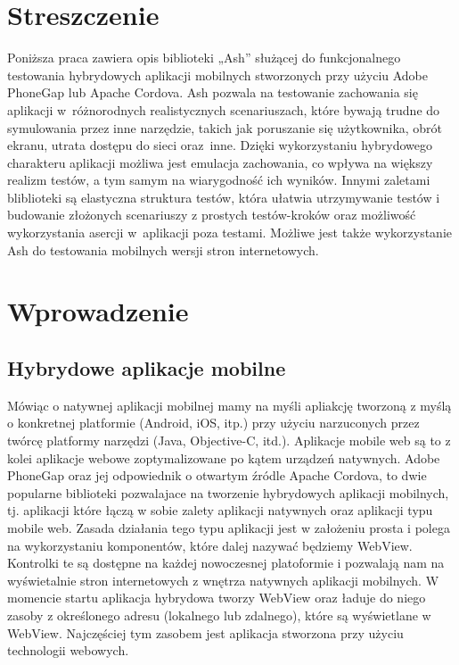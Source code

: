 \documentclass[a4paper]{article}
\begin{document}
\section{Streszczenie}
Poniższa praca zawiera opis biblioteki „Ash” służącej do funkcjonalnego testowania
hybrydowych aplikacji mobilnych stworzonych przy użyciu Adobe PhoneGap lub
Apache Cordova. Ash pozwala na testowanie zachowania się aplikacji w~różnorodnych
realistycznych scenariuszach, które bywają trudne do symulowania przez inne narzędzie, takich jak poruszanie się użytkownika,
obrót ekranu, utrata dostępu do sieci oraz~inne. Dzięki wykorzystaniu hybrydowego charakteru aplikacji
możliwa jest emulacja zachowania, co wpływa na większy realizm testów, a tym samym na wiarygodność ich wyników. Innymi
zaletami bliblioteki są elastyczna struktura testów, która ułatwia utrzymywanie
testów i budowanie złożonych scenariuszy z prostych testów-kroków oraz
możliwość wykorzystania asercji w~aplikacji poza testami.
Możliwe jest także wykorzystanie Ash do testowania mobilnych wersji stron internetowych. 

\section{Wprowadzenie}
\subsection{Hybrydowe aplikacje mobilne}
Mówiąc o natywnej aplikacji mobilnej mamy na myśli apliakcję tworzoną z myślą o konkretnej platformie (Android, iOS, itp.) przy użyciu narzuconych przez twórcę platformy narzędzi (Java, Objective-C, itd.). Aplikacje mobile web są to z kolei aplikacje webowe zoptymalizowane po kątem urządzeń natywnych.
Adobe PhoneGap oraz jej odpowiednik o otwartym źródle Apache Cordova, to
dwie popularne biblioteki pozwalajace na tworzenie hybrydowych aplikacji
mobilnych, tj. aplikacji które łączą w sobie zalety aplikacji natywnych oraz aplikacji
typu mobile web. Zasada działania tego typu aplikacji jest w założeniu prosta i
polega na wykorzystaniu komponentów, które dalej nazywać będziemy WebView.
Kontrolki te są dostępne na każdej nowoczesnej platoformie i pozwalają nam na
wyświetalnie stron internetowych z wnętrza natywnych aplikacji mobilnych. 
W momencie startu aplikacja hybrydowa tworzy WebView oraz ładuje do niego zasoby z określonego adresu (lokalnego lub zdalnego), które są wyświetlane w WebView. Najczęściej tym zasobem jest aplikacja stworzona przy użyciu technologii webowych.     
\end{document}
